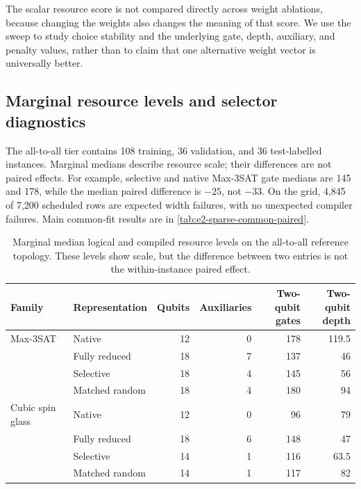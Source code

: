 \documentclass[a4paper,onecolumn,11pt,unpublished]{quantumarticle}
\theoremstyle{remark}
\begin{document}
The scalar resource score is not compared directly across weight ablations,
because changing the weights also changes the meaning of that score.  We use
the sweep to study choice stability and the underlying gate, depth, auxiliary,
and penalty values, rather than to claim that one alternative weight vector is
universally better.

\subsection{Marginal resource levels and selector diagnostics}
\label{app:results-resources}

The all-to-all tier contains 108 training, 36 validation, and 36 test-labelled
instances. Marginal medians describe resource scale; their differences are
not paired effects. For example, selective and native Max-3SAT gate medians
are 145 and 178, while the median paired difference is $-25$, not $-33$.
On the grid, 4,845 of 7,200 scheduled rows are expected width failures, with
no unexpected compiler failures. Main common-fit results are in
\cref{tab:e2-sparse-common-paired}.

\begin{table}[!htbp]
    \centering
    \small
    \caption{Marginal median logical and compiled resource levels on the
    all-to-all reference topology.  These levels show scale, but the difference
    between two entries is not the within-instance paired effect.}
    \label{tab:e2-all-to-all-resources}
    \begin{tabular}{@{}llrrrr@{}}
        \toprule
        Family & Representation
        & Qubits
        & Auxiliaries
        & \shortstack{Two-qubit\\gates}
        & \shortstack{Two-qubit\\depth}\\
        \midrule
        Max-3SAT & Native          & 12 & 0 & 178 & 119.5\\
                 & Fully reduced   & 18 & 7 & 137 & 46\\
                 & Selective       & 18 & 4 & 145 & 56\\
                 & Matched random  & 18 & 4 & 180 & 94\\
        \addlinespace
        Cubic spin glass & Native         & 12 & 0 & 96  & 79\\
                         & Fully reduced  & 18 & 6 & 148 & 47\\
                         & Selective      & 14 & 1 & 116 & 63.5\\
                         & Matched random & 14 & 1 & 117 & 82\\
        \bottomrule
    \end{tabular}
\end{table}
\end{document}
